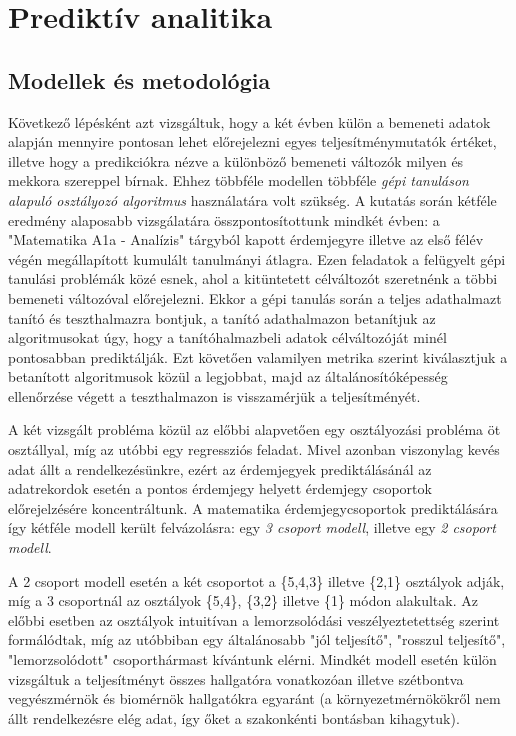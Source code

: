 \documentclass[12pt]{article}
\begin{document}
\section{Prediktív analitika}

\subsection{Modellek és metodológia}

Következő lépésként azt vizsgáltuk, hogy a két évben külön a bemeneti adatok alapján mennyire pontosan lehet előrejelezni egyes teljesítménymutatók értéket, illetve hogy a predikciókra nézve a különböző bemeneti változók milyen és mekkora szereppel bírnak. Ehhez többféle modellen többféle \textit{gépi tanuláson alapuló osztályozó algoritmus} használatára volt szükség. A kutatás során kétféle eredmény alaposabb vizsgálatára összpontosítottunk mindkét évben: a "Matematika A1a - Analízis" tárgyból kapott érdemjegyre illetve az első félév végén megállapított kumulált tanulmányi átlagra. Ezen feladatok a felügyelt gépi tanulási problémák közé esnek, ahol a kitüntetett célváltozót szeretnénk a többi bemeneti változóval előrejelezni. Ekkor a gépi tanulás során a teljes adathalmazt tanító és teszthalmazra bontjuk, a tanító adathalmazon betanítjuk az algoritmusokat úgy, hogy a tanítóhalmazbeli adatok célváltozóját minél pontosabban prediktálják. Ezt követően valamilyen metrika szerint kiválasztjuk a betanított algoritmusok közül a legjobbat, majd az általánosítóképesség ellenőrzése végett a teszthalmazon is visszamérjük a teljesítményét.

A két vizsgált probléma közül az előbbi alapvetően egy osztályozási probléma öt osztállyal, míg az utóbbi egy regressziós feladat. Mivel azonban viszonylag kevés adat állt a rendelkezésünkre, ezért az érdemjegyek prediktálásánál az adatrekordok esetén a pontos érdemjegy helyett érdemjegy csoportok előrejelzésére koncentráltunk. A matematika érdemjegycsoportok prediktálására így kétféle modell került felvázolásra: egy \textit{3 csoport modell}, illetve egy \textit{2 csoport modell}.

A 2 csoport modell esetén a két csoportot a \{5,4,3\} illetve \{2,1\} osztályok adják, míg a 3 csoportnál az osztályok \{5,4\}, \{3,2\} illetve \{1\} módon alakultak. Az előbbi esetben az osztályok intuitívan a lemorzsolódási veszélyeztetettség szerint formálódtak, míg az utóbbiban egy általánosabb "jól teljesítő", "rosszul teljesítő", "lemorzsolódott" csoporthármast kívántunk elérni. Mindkét modell esetén külön vizsgáltuk a teljesítményt összes hallgatóra vonatkozóan illetve szétbontva vegyészmérnök és biomérnök hallgatókra egyaránt (a környezetmérnökökről nem állt rendelkezésre elég adat, így őket a szakonkénti bontásban kihagytuk).
\end{document}
